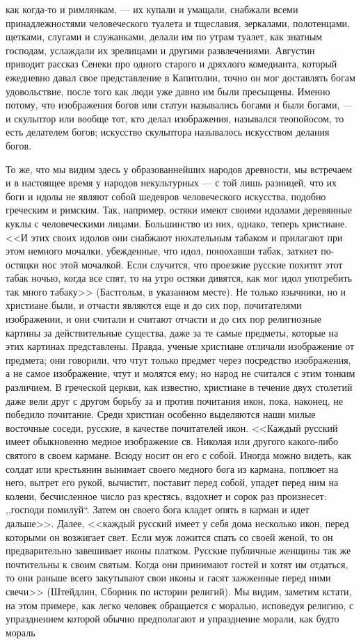 \documentclass[12pt]{article}
\begin{document}
как когда-то и римлянкам, --- их купали и умащали, снабжали всеми принадлежностями человеческого туалета и тщеславия, зеркалами, полотенцами, щетками, слугами и служанками, делали им по утрам туалет, как знатным господам, услаждали их зрелищами и другими развлечениями. Августин приводит рассказ Сенеки про одного старого и дряхлого комедианта, который ежедневно давал свое представление в Капитолии, точно он мог доставлять богам удовольствие, после того как люди уже давно им были пресыщены. Именно потому, что изображения богов или статуи назывались богами и были богами, --- и скульптор или вообще тот, кто делал изображения, назывался теопойосом, то есть делателем богов; искусство скульптора называлось искусством делания богов. 

То же, что мы видим здесь у образованнейших народов древности, мы встречаем и в настоящее время у народов некультурных --- с той лишь разницей, что их боги и идолы не являют собой шедевров человеческого искусства, подобно греческим и римским. Так, например, остяки имеют своими идолами деревянные куклы с человеческими лицами. Большинство из них, однако, теперь христиане. <<И этих своих идолов они снабжают нюхательным табаком и прилагают при этом немного мочалки, убежденные, что идол, понюхавши табак, заткнет по-остяцки нос этой мочалкой. Если случится, что проезжие русские похитят этот табак ночью, когда все спят, то на утро остяки дивятся, как мог идол употребить так много табаку>> (Бастгольм, в указанном месте). Не только язычники, но и христиане были, и отчасти являются еще и до сих пор, почитателями изображении, и они считали и считают отчасти и до сих пор религиозные картины за действительные существа, даже за те самые предметы, которые на этих картинах представлены. Правда, ученые христиане отличали изображение от предмета; они говорили, что чтут только предмет через посредство изображения, а не самое изображение, чтут и молятся ему; но народ не считался с этим тонким различием. В греческой церкви, как известно, христиане в течение двух столетий даже вели друг с другом борьбу за и против почитания икон, пока, наконец, не победило почитание. Среди христиан особенно выделяются наши милые восточные соседи, русские, в качестве почитателей икон. <<Каждый русский имеет обыкновенно медное изображение св. Николая или другого какого-либо святого в своем кармане. Всюду носит он его с собой. Иногда можно видеть, как солдат или крестьянин вынимает своего медного бога из кармана, поплюет на него, вытрет его рукой, вычистит, поставит перед собой, упадет перед ним на колени, бесчисленное число раз крестясь, вздохнет и сорок раз произнесет: ,,господи помилуй``. Затем он своего бога кладет опять в карман и идет дальше>>. Далее, <<каждый русский имеет у себя дома несколько икон, перед которыми он возжигает свет. Если муж ложится спать со своей женой, то он предварительно завешивает иконы платком. Русские публичные женщины так же почтительны к своим святым. Когда они принимают гостей и хотят им отдаться, то они раньше всего закутывают свои иконы и гасят зажженные перед ними свечи>> (Штейдлин, Сборник по истории религий). Мы видим, заметим кстати, на этом примере, как легко человек обращается с моралью, исповедуя религию, с упразднением которой обычно предполагают и упразднение морали, как будто мораль 
\end{document}
